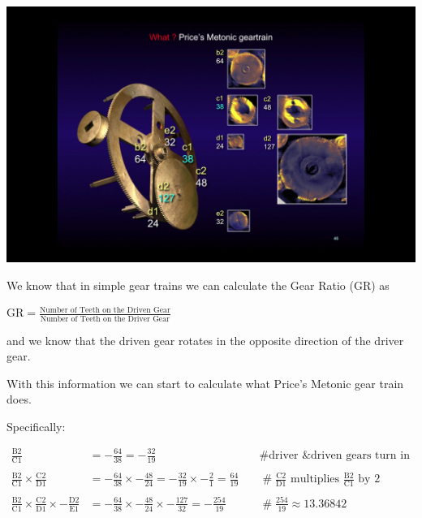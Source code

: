 \documentclass[11pt, oneside]{article}   	%
\theoremstyle{definition}
\begin{document}
\hfill
\begin{minipage}[c]{0.5\textwidth}
  \includegraphics[width=\textwidth,cfbox=red]{images/price_metonic_gear_train.png}
\end{minipage}

\newpage

\bigskip
\noindent
We know that in simple gear trains we can calculate the Gear Ratio (GR) as 

\bigskip
\begin{center}
{\Large $\text{GR} = \frac{\text{Number of Teeth on the Driven Gear}}{\text{Number of Teeth on the Driver Gear}}$}
\end{center}

\bigskip
\noindent
and we know that the driven gear rotates in the opposite direction of the driver gear. 


\bigskip
\noindent
With this information we can start to calculate what Price's Metonic gear train does. 

\bigskip
\noindent
Specifically:

\begin{equation*}
\begin{array}{lllll}
\frac{\text{B2}}{\text{C1}} &= - \frac{64}{38} = - \frac{32}{19} & \quad \mathrel{\#} \text{driver \& driven gears turn in opposite directions} \\ \\
\frac{\text{B2}}{\text{C1}} \times \frac{\text{C2}}{\text{D1}} &= - \frac{64}{38} \times - \frac{48}{24} = - \frac{32}{19} \times - \frac{2}{1} = \frac{64}{19} 
& \quad \mathrel{\#} \frac{\text{C2}}{\text{D1}} \text{ multiplies $\frac{\text{B2}}{\text{C1}}$ by $2$}                       \\ \\
\frac{\text{B2}}{\text{C1}} \times \frac{\text{C2}}{\text{D1}} \times - \frac{\text{D2}}{\text{E1}} &= - \frac{64}{38} \times - \frac{48}{24} \times - \frac{127}{32} 
=  -\frac{254}{19} & \quad \mathrel{\#} \frac{254}{19} \approx 13.36842
\end{array}
\end{equation*}
\end{document}
